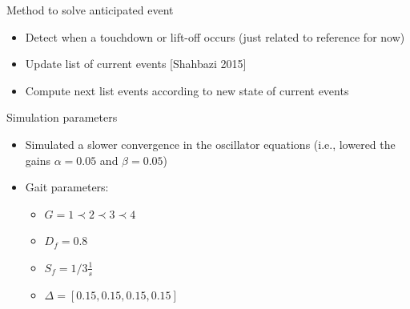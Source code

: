 \documentclass{beamer}
\begin{document}
\begin{frame}{Method to solve anticipated event}
\begin{itemize}
\item Detect when a touchdown or lift-off occurs (just related to reference for now)
\item Update list of current events [Shahbazi 2015]
\item Compute next list events according to new state of current events
\end{itemize}
\begin{table}[]
\centering
\label{my-label}
\end{table}

\end{frame}
\begin{frame}{Simulation parameters}
\begin{itemize}\setlength\itemsep{3em}
\item Simulated a slower convergence in the oscillator equations (i.e., lowered the gains $\alpha = 0.05$ and $\beta = 0.05$)
\item Gait parameters:
\begin{itemize}
\item $G={1}\prec {2} \prec {3} \prec {4}$
\item $D_f = 0.8$
\item $S_f = 1/3 \frac{1}{s}$
\item $\Delta = [0.15,0.15,0.15,0.15]$
\end{itemize}
\end{itemize}

\end{frame}
\end{document}
